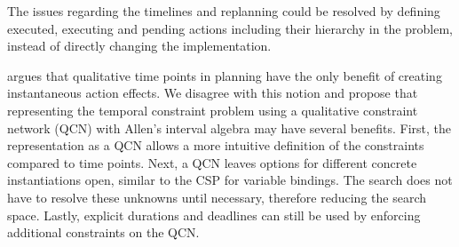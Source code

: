The issues regarding the timelines and replanning could be resolved by defining executed, executing and pending actions including their hierarchy in the problem, instead of directly changing the implementation.

\cite{bit-monnotTemporalHierarchicalModels2016a} argues that qualitative time points in planning have the only benefit of creating instantaneous action effects.
We disagree with this notion and propose that representing the temporal constraint problem using a qualitative constraint network (QCN) with Allen's interval algebra may have several benefits. 
First, the representation as a QCN allows a more intuitive definition of the constraints compared to time points.
Next, a QCN leaves options for different concrete instantiations open, similar to the CSP for variable bindings.
The search does not have to resolve these unknowns until necessary, therefore reducing the search space.
Lastly, explicit durations and deadlines can still be used by enforcing additional constraints on the QCN.





